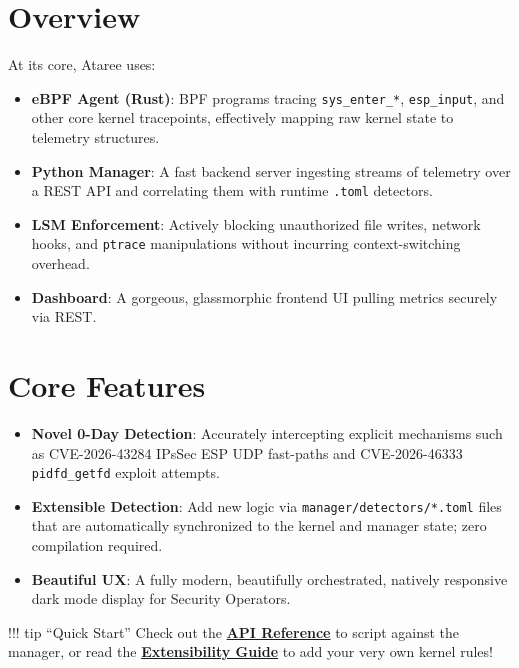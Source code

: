 \documentclass[
  12pt,
]{report}
\providecommand{\tightlist}{%
  \setlength{\itemsep}{0pt}\setlength{\parskip}{0pt}}
\begin{document}
\section{Overview}\label{overview}

At its core, Ataree uses:

\begin{itemize}
\tightlist
\item
  \textbf{eBPF Agent (Rust)}: BPF programs tracing
  \texttt{sys\_enter\_*}, \texttt{esp\_input}, and other core kernel
  tracepoints, effectively mapping raw kernel state to telemetry
  structures.
\item
  \textbf{Python Manager}: A fast backend server ingesting streams of
  telemetry over a REST API and correlating them with runtime
  \texttt{.toml} detectors.
\item
  \textbf{LSM Enforcement}: Actively blocking unauthorized file writes,
  network hooks, and \texttt{ptrace} manipulations without incurring
  context-switching overhead.
\item
  \textbf{Dashboard}: A gorgeous, glassmorphic frontend UI pulling
  metrics securely via REST.
\end{itemize}

\section{Core Features}\label{core-features}

\begin{itemize}
\tightlist
\item
  \textbf{Novel 0-Day Detection}: Accurately intercepting explicit
  mechanisms such as CVE-2026-43284 IPsSec ESP UDP fast-paths and
  CVE-2026-46333 \texttt{pidfd\_getfd} exploit attempts.
\item
  \textbf{Extensible Detection}: Add new logic via
  \texttt{manager/detectors/*.toml} files that are automatically
  synchronized to the kernel and manager state; zero compilation
  required.
\item
  \textbf{Beautiful UX}: A fully modern, beautifully orchestrated,
  natively responsive dark mode display for Security Operators.
\end{itemize}

!!! tip ``Quick Start'' Check out the
\textbf{\href{api-reference.md}{API Reference}} to script against the
manager, or read the \textbf{\href{extensibility.md}{Extensibility
Guide}} to add your very own kernel rules!

\clearpage
\end{document}
